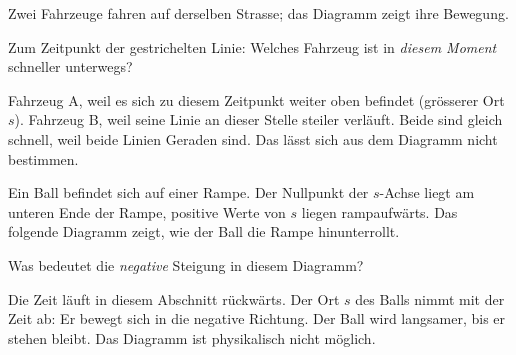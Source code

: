 \documentclass[11pt,a4paper]{exam}
\begin{document}
\begin{questions}
\question Zwei Fahrzeuge fahren auf derselben Strasse; das Diagramm zeigt
ihre Bewegung.
\begin{center}
\end{center}
Zum Zeitpunkt der gestrichelten Linie: Welches Fahrzeug ist in \emph{diesem
Moment} schneller unterwegs?
\begin{choices}
  \choice Fahrzeug A, weil es sich zu diesem Zeitpunkt weiter oben
  befindet (grösserer Ort $s$).
  \CorrectChoice Fahrzeug B, weil seine Linie an dieser Stelle steiler
  verläuft.
  \choice Beide sind gleich schnell, weil beide Linien Geraden sind.
  \choice Das lässt sich aus dem Diagramm nicht bestimmen.
\end{choices}

\question Ein Ball befindet sich auf einer Rampe. Der Nullpunkt der
$s$-Achse liegt am unteren Ende der Rampe, positive Werte von $s$ liegen
rampaufwärts. Das folgende Diagramm zeigt, wie der Ball die Rampe
hinunterrollt.
\begin{center}
\end{center}
Was bedeutet die \emph{negative} Steigung in diesem Diagramm?
\begin{choices}
  \choice Die Zeit läuft in diesem Abschnitt rückwärts.
  \CorrectChoice Der Ort $s$ des Balls nimmt mit der Zeit ab: Er bewegt
  sich in die negative Richtung.
  \choice Der Ball wird langsamer, bis er stehen bleibt.
  \choice Das Diagramm ist physikalisch nicht möglich.
\end{choices}


\end{questions}
\end{document}
